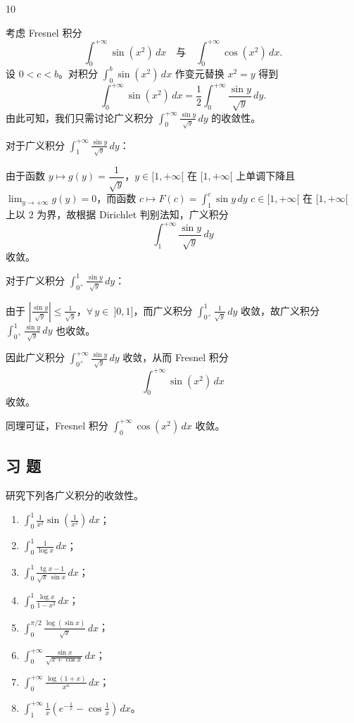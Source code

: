 \begin{sourceexample}{10}

考虑 Fresnel 积分
\[\int_0^{+\infty}\sin(x^2)\,dx\quad\text{与}\quad\int_0^{+\infty}\cos(x^2)\,dx.\]
设 $0<c<b$。对积分 $\displaystyle\int_0^b\sin(x^2)\,dx$ 作变元替换 $x^2=y$ 得到
\[\int_0^{+\infty}\sin(x^2)\,dx=\frac{1}{2}\int_0^{+\infty}\frac{\sin y}{\sqrt{y}}\,dy.\]
由此可知，我们只需讨论广义积分 $\displaystyle\int_0^{+\infty}\frac{\sin y}{\sqrt{y}}\,dy$ 的收敛性。

对于广义积分 $\displaystyle\int_1^{+\infty}\frac{\sin y}{\sqrt{y}}\,dy$：

由于函数 $y\longmapsto g(y)=\dfrac{1}{\sqrt{y}}$，$y\in[1,+\infty[$ 在 $[1,+\infty[$ 上单调下降且 $\displaystyle\lim_{y\to+\infty}g(y)=0$，而函数 $c\longmapsto F(c)=\displaystyle\int_1^c\sin y\,dy$ $c\in[1,+\infty[$ 在 $[1,+\infty[$ 上以 $2$ 为界，故根据 Dirichlet 判别法知，广义积分
\[\int_1^{+\infty}\frac{\sin y}{\sqrt{y}}\,dy\]
收敛。

对于广义积分 $\displaystyle\int_{0^+}^1\frac{\sin y}{\sqrt{y}}\,dy$：

由于 $\displaystyle\left|\frac{\sin y}{\sqrt{y}}\right|\leqslant\frac{1}{\sqrt{y}}$，$\forall\,y\in\ ]0,1]$，而广义积分 $\displaystyle\int_{0^+}^1\frac{1}{\sqrt{y}}\,dy$ 收敛，故广义积分 $\displaystyle\int_{0^+}^1\frac{\sin y}{\sqrt{y}}\,dy$ 也收敛。

因此广义积分 $\displaystyle\int_{0^+}^{+\infty}\frac{\sin y}{\sqrt{y}}\,dy$ 收敛，从而 Fresnel 积分
\[\int_0^{+\infty}\sin(x^2)\,dx\]
收敛。

同理可证，Fresnel 积分 $\displaystyle\int_0^{+\infty}\cos(x^2)\,dx$ 收敛。

\end{sourceexample}

\subsection*{习 题}

\begin{exercise}
	\item 研究下列各广义积分的收敛性。
	\begin{enumerate}[label=\arabic*)]
		\item $\displaystyle\int_0^1\frac{1}{x^2}\sin\left(\frac{1}{x^2}\right)\,dx$；
		\item $\displaystyle\int_0^1\frac{1}{\log x}\,dx$；
		\item $\displaystyle\int_0^1\frac{\operatorname{tg}x-1}{\sqrt{x}\,\sin x}\,dx$；
		\item $\displaystyle\int_0^1\frac{\log x}{1-x^2}\,dx$；
		\item $\displaystyle\int_0^{\pi/2}\frac{\log(\sin x)}{\sqrt{x}}\,dx$；
		\item $\displaystyle\int_0^{+\infty}\frac{\sin x}{\sqrt{x+\cos x}}\,dx$；
		\item $\displaystyle\int_0^{+\infty}\frac{\log(1+x)}{x^n}\,dx$；
		\item $\displaystyle\int_1^{+\infty}\frac{1}{x}\left(e^{-\frac{1}{x}}-\cos\frac{1}{x}\right)\,dx$。
	\end{enumerate}
\end{exercise}

